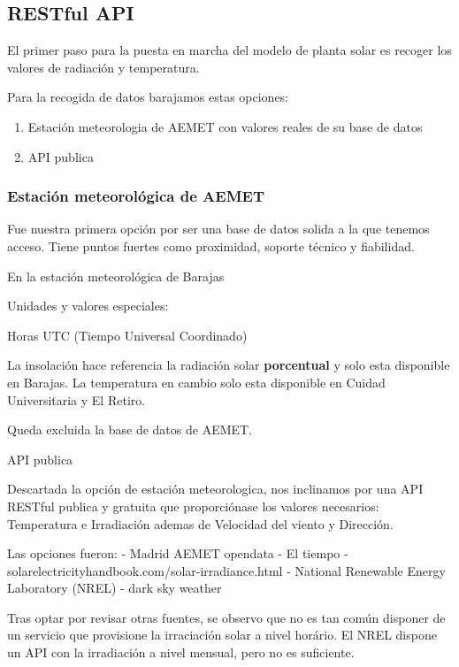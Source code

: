 \subsection{RESTful API} 
\label{sub:API}

El primer paso para la puesta en marcha del modelo de planta solar es recoger los valores de radiación y temperatura.

Para la recogida de datos barajamos estas opciones:
\begin{enumerate}
    \item Estación meteorologia de AEMET con valores reales de su base de datos
    \item API publica
\end{enumerate}


\subsubsection{Estación meteorológica de AEMET}
\label{ssub:estación_meteorológica_de_aemet}

Fue nuestra primera opción por ser una base de datos solida a la que tenemos acceso. Tiene puntos fuertes como proximidad, soporte técnico y fiabilidad.

En la estación meteorológica de Barajas

% 

Unidades y valores especiales:

Horas UTC (Tiempo Universal Coordinado)


La insolación hace referencia la radiación solar \textbf{porcentual} y solo esta disponible en Barajas.
La temperatura en cambio solo esta disponible en Cuidad Universitaria y El Retiro.

Queda excluida la base de datos de AEMET.

API publica

Descartada la opción de estación meteorologica, nos inclinamos por una API RESTful publica y gratuita que proporciónase los valores necesarios: Temperatura e Irradiación ademas de Velocidad del viento y Dirección.

Las opciones fueron:
- Madrid AEMET opendata
- El tiempo
- solarelectricityhandbook.com/solar-irradiance.html
- National Renewable Energy Laboratory (NREL)
- dark sky weather

Tras optar por revisar otras fuentes, se observo que no es tan común disponer de un servicio que provisione la irraciación solar a nivel horário. El NREL dispone un API con la irradiación a nivel mensual, pero no es suficiente.

